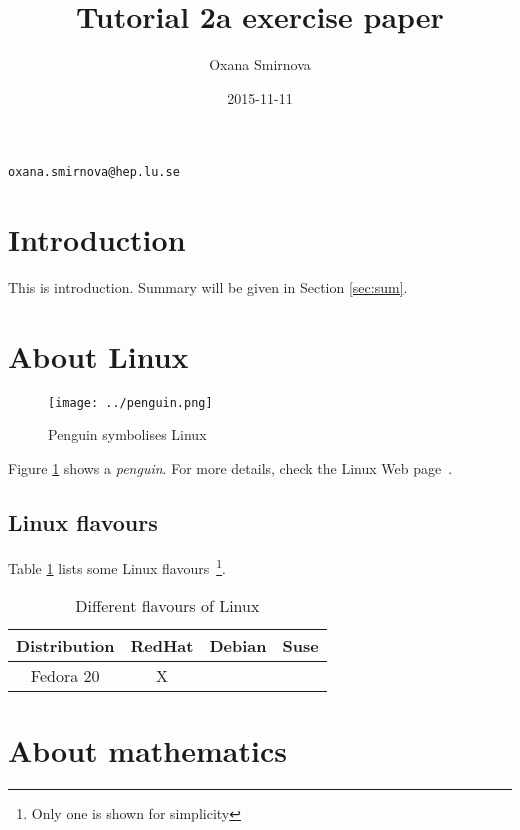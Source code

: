 \documentclass[a4paper,12pt,twoside]{article}
\author{Oxana Smirnova}
\title{Tutorial 2a exercise paper}
\date{2015-11-11}
\begin{document}
\maketitle
 
\begin{center}
  \texttt{oxana.smirnova@hep.lu.se}
\end{center}
\section{Introduction}
\label{sec:intro}
This is introduction. Summary will be given in Section \ref{sec:sum}.
\section{About Linux}
\label{sec:linux}
\begin{figure}[h]
  \begin{center}
  \texttt{[image: ../penguin.png]}
  \caption{Penguin symbolises Linux}
  \label{fig:penguin}
  \end{center}
\end{figure}

Figure \ref{fig:penguin} shows a \textit{penguin}. For more details, check the Linux Web page~\cite{linux}.

\subsection{Linux flavours}
\label{sec:flavours}
Table \ref{tab:flavours} lists some Linux flavours~\footnote{Only one is shown for simplicity}.
\begin{table}[h]
\begin{center}
  \caption{Different flavours of Linux}
  \label{tab:flavours}
  \begin{tabular}{c||c|c|c}
    \textbf{Distribution} & RedHat & Debian & Suse \\ \hline \hline
    Fedora 20 		  & X      &	    &      \\ \hline
  \end{tabular}

\end{center}

\end{table}

\section{About mathematics}
\label{sec:math}
\end{document}
